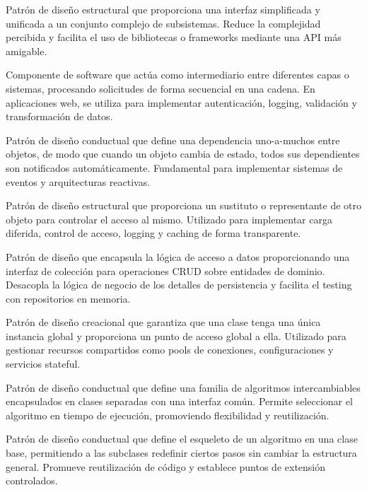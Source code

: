 \begin{description}[style=nextline,leftmargin=0pt]
    \item[Façade (Fachada)]
    Patrón de diseño estructural que proporciona una interfaz simplificada y unificada a un conjunto complejo de subsistemas. Reduce la complejidad percibida y facilita el uso de bibliotecas o frameworks mediante una API más amigable.
    
    \item[Middleware]
    Componente de software que actúa como intermediario entre diferentes capas o sistemas, procesando solicitudes de forma secuencial en una cadena. En aplicaciones web, se utiliza para implementar autenticación, logging, validación y transformación de datos.
    
    \item[Observer (Observador)]
    Patrón de diseño conductual que define una dependencia uno-a-muchos entre objetos, de modo que cuando un objeto cambia de estado, todos sus dependientes son notificados automáticamente. Fundamental para implementar sistemas de eventos y arquitecturas reactivas.
    
    \item[Proxy]
    Patrón de diseño estructural que proporciona un sustituto o representante de otro objeto para controlar el acceso al mismo. Utilizado para implementar carga diferida, control de acceso, logging y caching de forma transparente.
    
    \item[Repository (Repositorio)]
    Patrón de diseño que encapsula la lógica de acceso a datos proporcionando una interfaz de colección para operaciones CRUD sobre entidades de dominio. Desacopla la lógica de negocio de los detalles de persistencia y facilita el testing con repositorios en memoria.
    
    \item[Singleton]
    Patrón de diseño creacional que garantiza que una clase tenga una única instancia global y proporciona un punto de acceso global a ella. Utilizado para gestionar recursos compartidos como pools de conexiones, configuraciones y servicios stateful.
    
    \item[Strategy (Estrategia)]
    Patrón de diseño conductual que define una familia de algoritmos intercambiables encapsulados en clases separadas con una interfaz común. Permite seleccionar el algoritmo en tiempo de ejecución, promoviendo flexibilidad y reutilización.
    
    \item[Template Method (Método Plantilla)]
    Patrón de diseño conductual que define el esqueleto de un algoritmo en una clase base, permitiendo a las subclases redefinir ciertos pasos sin cambiar la estructura general. Promueve reutilización de código y establece puntos de extensión controlados.
    

\end{description}
